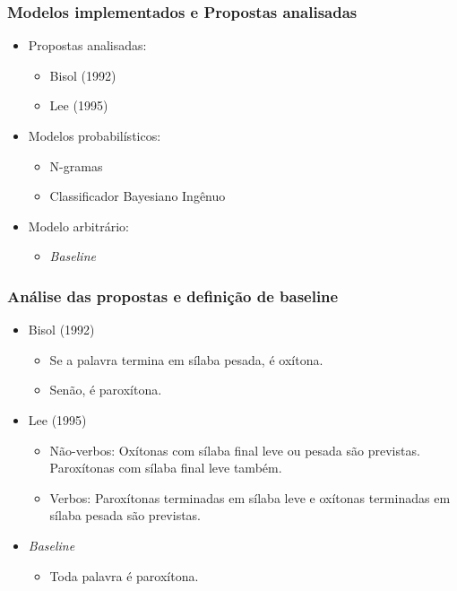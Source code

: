 \documentclass[xcolor=table]{beamer}
\begin{document}
	\begin{frame}
		\frametitle{Modelos implementados e Propostas analisadas}
		\begin{itemize}
			\item Propostas analisadas:\\
			\begin{itemize}
				\item Bisol (1992)\\
				\item Lee (1995)\\
			\end{itemize}
			\item Modelos probabilísticos:\\
			\begin{itemize}
				\item N-gramas\\
				\item Classificador Bayesiano Ingênuo\\
			\end{itemize}
			\item Modelo arbitrário:
			\begin{itemize}
				\item \textit{Baseline}\\
			\end{itemize}			
		\end{itemize}
	\end{frame}
	\begin{frame}
		\frametitle{Análise das propostas e definição de baseline}
		\begin{itemize}
			\item Bisol (1992)\\
			\begin{itemize}
				\item Se a palavra termina em sílaba pesada, é oxítona.\\
				\item Senão, é paroxítona.\\
			\end{itemize}
			\item Lee (1995)\\
			\begin{itemize}
				\item Não-verbos: Oxítonas com sílaba final leve ou pesada são previstas. Paroxítonas com sílaba final leve também.\\
				\item Verbos: Paroxítonas terminadas em sílaba leve e oxítonas terminadas em sílaba pesada são previstas.
			\end{itemize}
			\item \textit{Baseline}\\
			\begin{itemize}
				\item Toda palavra é paroxítona.\\
			\end{itemize}
		\end{itemize}
	\end{frame}
\end{document}
